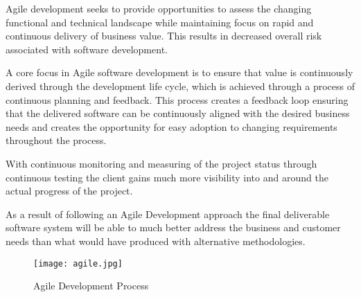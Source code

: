 Agile development seeks to provide opportunities to assess the changing functional and technical landscape while maintaining focus on rapid and continuous delivery of business value. This results in decreased overall risk associated with software development.

A core focus in Agile software development is to ensure that value is continuously derived through the development life cycle, which is achieved through a process of continuous planning and feedback. This process creates a feedback loop ensuring that the delivered software can be continuously aligned with the desired business needs and creates the opportunity for easy adoption to changing requirements throughout the process.

With continuous monitoring and measuring of the project status through continuous testing the client gains much more visibility into and around the actual progress of the project.

As a result of following an Agile Development approach the final deliverable software system will be able to much better address the business and customer needs than what would have produced with alternative methodologies.

\begin{figure}[t]
  \centering
  \texttt{[image: agile.jpg]}
  \caption{Agile Development Process}
\end{figure}
